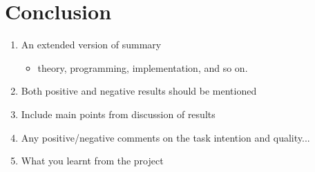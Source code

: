 \section{Conclusion}\label{sec:conclusion}
\begin{enumerate}[i]
    \item An extended version of summary
    \begin{itemize}
        \item theory, programming, implementation, and so on.
    \end{itemize}
    \item Both positive and negative results should be mentioned
    \item Include main points from discussion of results
    \item Any positive/negative comments on the task intention and quality...
    \item What you learnt from the project
\end{enumerate}
